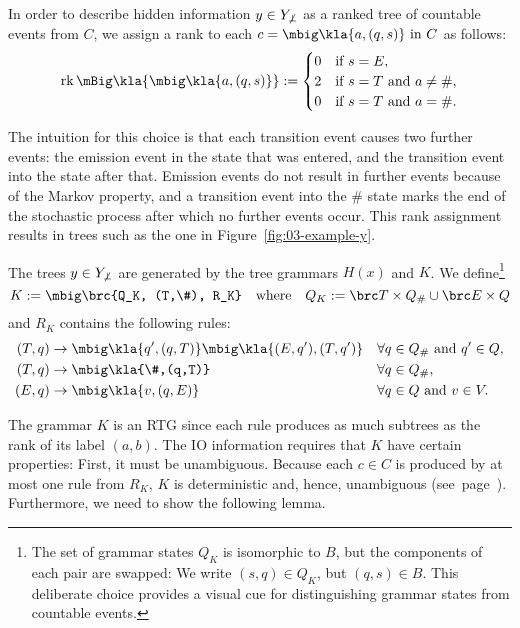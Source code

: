 In order to describe hidden information $y\in Y_{\not\bot}$ as a ranked tree of countable
events from $C$, we assign a rank to each $c = \mbig\kla{a,(q,s)}\isin C$ as follows:
\begin{align*}
 \rk\mBig\kla{\mbig\kla{a,(q,s)}} := \begin{cases}
  0 & \text{if } s = E, \\
  2 & \text{if } s = T \text{ and } a\neq\#, \\
  0 & \text{if } s = T \text{ and } a = \#.
 \end{cases}
\end{align*}

The intuition for this choice is that each transition event causes two further
events: the emission event in the state that was entered, and the transition
event into the state after that. Emission events do not result in further
events because of the Markov property, and a transition event into the $\#$
state marks the end of the stochastic process after which no further events
occur. This rank assignment results in trees such as the one in
Figure~\ref{fig:03-example-y}.

The trees $y\in Y_{\not\bot}$ are generated by the tree grammars $H(x)$ and $K$. We
define\footnote{The set of grammar states $Q_K$ is isomorphic to $B$, but the
components of each pair are swapped: We write $(s,q)\in Q_K$, but $(q,s)\in B$.
This deliberate choice provides a visual cue for distinguishing grammar states
from countable events.}
\label{eq:03-K}\[
 K := \mbig\brc{Q_K, (T,\#), R_K} \quad\text{where}\quad Q_K := \brc T \times Q_\# \cup \brc E \times Q
\]
and $R_K$ contains the following rules:
\label{eq:03-R_K}\begin{align*}
 (T,q) &\to \mbig\kla{q',(q,T)}\mbig\kla{(E,q'),(T,q')} &&\forall q\in Q_\# \text{ and } q'\in Q, \\
 (T,q) &\to \mbig\kla{\#,(q,T)} &&\forall q\in Q_\#, \\
 (E,q) &\to \mbig\kla{v,(q,E)} &&\forall q\in Q \text{ and } v\in V.
\end{align*}

The grammar $K$ is an RTG since each rule produces as much subtrees as the rank
of its label $(a,b)$. The IO information requires that $K$ have certain
properties: First, it must be unambiguous. Because each $c\in C$ is produced by
at most one rule from $R_K$, $K$ is deterministic and, hence, unambiguous
(see~page~\pageref{lemma:02-deterministic-is-unambiguous}). Furthermore, we
need to show the following lemma.


